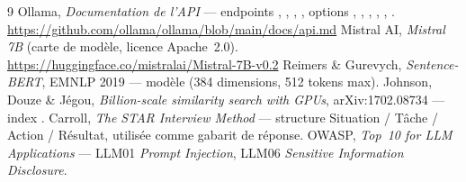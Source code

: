 \documentclass[11pt,a4paper]{article}
\begin{document}
\clearpage
\begingroup
\renewcommand{\bibname}{Références}
\begin{thebibliography}{9}\small
{} Ollama, \emph{Documentation de l'API} --- endpoints
  , , , ,
  options , , , ,
  , . \url{https://github.com/ollama/ollama/blob/main/docs/api.md}
 Mistral AI, \emph{Mistral 7B} (carte de modèle,
  licence Apache~2.0). \url{https://huggingface.co/mistralai/Mistral-7B-v0.2}
 Reimers \& Gurevych, \emph{Sentence-BERT}, EMNLP 2019 ---
  modèle  (384 dimensions, 512 tokens max).
 Johnson, Douze \& Jégou, \emph{Billion-scale similarity search
  with GPUs}, arXiv:1702.08734 --- index .
 Carroll, \emph{The STAR Interview Method} --- structure
  Situation / Tâche / Action / Résultat, utilisée comme gabarit de réponse.
 OWASP, \emph{Top~10 for LLM Applications} ---
  LLM01 \emph{Prompt Injection}, LLM06 \emph{Sensitive Information Disclosure}.
\end{thebibliography}
\endgroup
\end{document}
